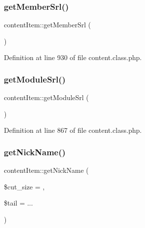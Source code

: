 \hypertarget{classcontentItem_a3356fefc2abd34642fa229f5a150cbdd}{}\label{classcontentItem_a3356fefc2abd34642fa229f5a150cbdd} 
\subsubsection{\texorpdfstring{get\+Member\+Srl()}{getMemberSrl()}}
{\footnotesize\ttfamily content\+Item\+::get\+Member\+Srl (\begin{DoxyParamCaption}{ }\end{DoxyParamCaption})}



Definition at line 930 of file content.\+class.\+php.

\hypertarget{classcontentItem_a62686ab7afb76f1239a3824be0e2ded8}{}\label{classcontentItem_a62686ab7afb76f1239a3824be0e2ded8} 
\subsubsection{\texorpdfstring{get\+Module\+Srl()}{getModuleSrl()}}
{\footnotesize\ttfamily content\+Item\+::get\+Module\+Srl (\begin{DoxyParamCaption}{ }\end{DoxyParamCaption})}



Definition at line 867 of file content.\+class.\+php.

\hypertarget{classcontentItem_a16947acbbeff208471271acd16d5f8f1}{}\label{classcontentItem_a16947acbbeff208471271acd16d5f8f1} 
\subsubsection{\texorpdfstring{get\+Nick\+Name()}{getNickName()}}
{\footnotesize\ttfamily content\+Item\+::get\+Nick\+Name (\begin{DoxyParamCaption}\item[{}]{\$cut\+\_\+size = {},  }\item[{}]{\$tail = {\ttfamily \textquotesingle{}...\textquotesingle{}} }\end{DoxyParamCaption})}



